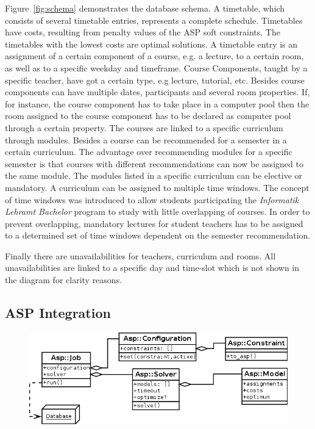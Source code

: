 \documentclass[12pt]{article} %
\begin{document}
Figure~\ref{fig:schema} demonstrates the database schema.
A timetable, which consists of several timetable entries, represents a complete schedule.
Timetables have costs, resulting from penalty values of the ASP soft constraints.
The timetables with the lowest costs are optimal solutions.
A timetable entry is an assignment of a certain component of a course, e.g. a lecture, to a certain room, as well as to a specific weekday and timeframe. 
Course Components, taught by a specific teacher, have got a certain type, e.g lecture, tutorial, etc.
Besides course components can have multiple dates, participants and several room properties.
If, for instance, the course component has to take place in a computer pool then the room assigned to the course component has to be declared as computer pool through a certain property.
The courses are linked to a specific curriculum through modules.
Besides a course can be recommended for a semester in a certain curriculum.
The advantage over recommending modules for a specific semester is that courses with different recommendations can now be assigned to the same module.
The modules listed in a specific curriculum can be elective or mandatory.
A curriculum can be assigned to multiple time windows.
The concept of time windows was introduced to allow students participating the \emph{Informatik Lehramt Bachelor} program to study with little overlapping of courses.
In order to prevent overlapping, mandatory lectures for student teachers has to be assigned to a determined set of time windows dependent on the semester recommendation.

Finally there are unavailabilities for teachers, curriculum and rooms.
All unavailabilities are linked to a specific day and time-slot which is not shown in the diagram for clarity reasons.

\subsection{ASP Integration} 

\begin{figure}[h]
    \includegraphics[width=\textwidth]{Images/AspClassDiagram.png}
    \label{fig:class_diagram}
\end{figure}
\end{document}
